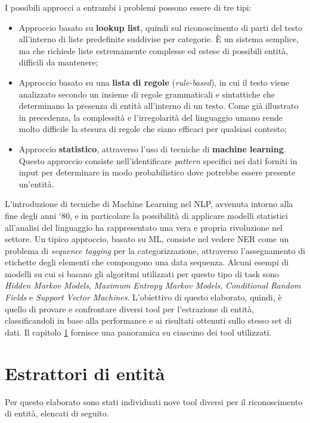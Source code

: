 \documentclass[a4paper,11pt]{article}
\begin{document}
I possibili approcci a entrambi i problemi possono essere di tre tipi:

\begin{itemize}
	\item Approccio basato su \textbf{lookup list}, quindi sul riconoscimento di parti del testo all’interno di liste predefinite suddivise per categorie. È un sistema semplice, ma che richiede liste estremamente complesse ed estese di possibili entità, difficili da mantenere; 
	\item Approccio basato su una \textbf{lista di regole} (\textit{rule-based}), in cui il testo viene analizzato secondo un insieme di regole grammaticali e sintattiche che determinano la presenza di entità all’interno di un testo. Come già illustrato in precedenza, la complessità e l'irregolarità del linguaggio umano rende molto difficile la stesura di regole che siano efficaci per qualsiasi contesto;
	\item Approccio \textbf{statistico}, attraverso l’uso di tecniche di \textbf{machine learning}. Questo approccio consiste nell’identificare \textit{pattern} specifici nei dati forniti in input per determinare in modo probabilistico dove potrebbe essere presente un’entità.
\end{itemize}

L'introduzione di tecniche di Machine Learning nel NLP, avvenuta intorno alla fine degli anni ‘80, e in particolare la possibilità di applicare modelli statistici all'analisi del linguaggio ha rappresentato una vera e propria rivoluzione nel settore. Un tipico approccio, basato su ML, consiste nel vedere NER come un problema di \textit{sequence tagging} per la categorizzazione, attraverso l’assegnamento di etichette degli elementi che compongono una data sequenza.
Alcuni esempi di modelli su cui si basano gli algoritmi utilizzati per questo tipo di task
sono \textit{Hidden Markov Models}, \textit{Maximum Entropy Markov Models}, \textit{Conditional Random Fields} e \textit{Support Vector Machines}. \cite{nlp-ner-tesi}
\newline
\newline
L'obiettivo di questo elaborato, quindi, è quello di provare e confrontare diversi tool per l'estrazione di entità, classificandoli in base alla performance e ai risultati ottenuti sullo stesso set di dati. Il capitolo \ref{sec:entityextractors} fornisce una panoramica su ciascuno dei tool utilizzati.

\clearpage
\section{Estrattori di entità}
\label{sec:entityextractors}
Per questo elaborato sono stati individuati nove tool diversi per il riconoscimento di entità, elencati di seguito.
\end{document}
